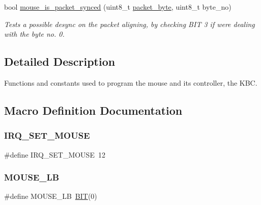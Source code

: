 \begin{DoxyCompactItemize}
bool \mbox{\hyperlink{group__mouse_ga3d0c72c442c9903f8ca9e71fe973883a}{mouse\+\_\+is\+\_\+packet\+\_\+synced}} (uint8\+\_\+t \mbox{\hyperlink{mouse_8c_aa930701390a0652cab793497401d4736}{packet\+\_\+byte}}, uint8\+\_\+t byte\+\_\+no)
\begin{DoxyCompactList}\small\item\em Tests a possible desync on the packet aligning, by checking B\+IT 3 if we\textquotesingle{}re dealing with the byte no. 0. \end{DoxyCompactList}\end{DoxyCompactItemize}


\subsection{Detailed Description}
Functions and constants used to program the mouse and its controller, the K\+BC. 

\subsection{Macro Definition Documentation}
\mbox{\label{group__mouse_ga76920fcbc0475dc2a9289514aed1f667}} 
\subsubsection{\texorpdfstring{I\+R\+Q\+\_\+\+S\+E\+T\+\_\+\+M\+O\+U\+SE}{IRQ\_SET\_MOUSE}}
{\footnotesize\ttfamily \#define I\+R\+Q\+\_\+\+S\+E\+T\+\_\+\+M\+O\+U\+SE~12}

\mbox{\label{group__mouse_ga81c0f94add844b0761bd142f7f708431}} 
\subsubsection{\texorpdfstring{M\+O\+U\+S\+E\+\_\+\+LB}{MOUSE\_LB}}
{\footnotesize\ttfamily \#define M\+O\+U\+S\+E\+\_\+\+LB~\mbox{\hyperlink{group__uart_ga3a8ea58898cb58fc96013383d39f482c}{B\+IT}}(0)}

\mbox{\label{group__mouse_ga5a934eaadd3536aabe6df0adf6728e8e}} 
